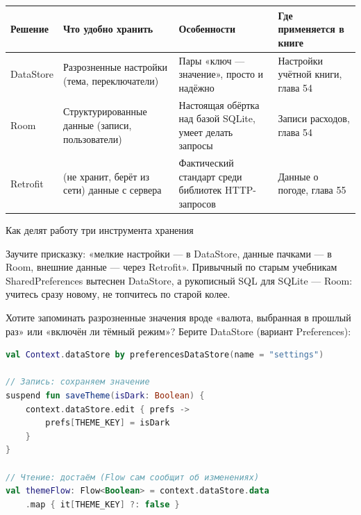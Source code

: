


\begin{center}
\begin{tabularx}{\linewidth}{|X|X|X|X|}
\hline
\textbf{Решение} & \textbf{Что удобно хранить} & \textbf{Особенности} & \textbf{Где применяется в книге} \tabularnewline
\hline
DataStore & Разрозненные настройки (тема, переключатели) & Пары «ключ — значение», просто и надёжно & Настройки учётной книги, глава 54 \tabularnewline
Room & Структурированные данные (записи, пользователи) & Настоящая обёртка над базой SQLite, умеет делать запросы & Записи расходов, глава 54 \tabularnewline
Retrofit & (не хранит, берёт из сети) данные с сервера & Фактический стандарт среди библиотек HTTP-запросов & Данные о погоде, глава 55 \tabularnewline
\hline
\end{tabularx}
\end{center}

\begin{center}\small\color{gray}Как делят работу три инструмента хранения\end{center}

Заучите присказку: «мелкие настройки — в DataStore, данные пачками — в Room, внешние данные — через Retrofit». Привычный по старым учебникам SharedPreferences вытеснен DataStore, а рукописный SQL для SQLite — Room: учитесь сразу новому, не топчитесь по старой колее.


Хотите запоминать разрозненные значения вроде «валюта, выбранная в прошлый раз» или «включён ли тёмный режим»? Берите DataStore (вариант Preferences):

\begin{lstlisting}[language=Kotlin]
val Context.dataStore by preferencesDataStore(name = "settings")

// Запись: сохраняем значение
suspend fun saveTheme(isDark: Boolean) {
    context.dataStore.edit { prefs ->
        prefs[THEME_KEY] = isDark
    }
}

// Чтение: достаём (Flow сам сообщит об изменениях)
val themeFlow: Flow<Boolean> = context.dataStore.data
    .map { it[THEME_KEY] ?: false }
\end{lstlisting}

